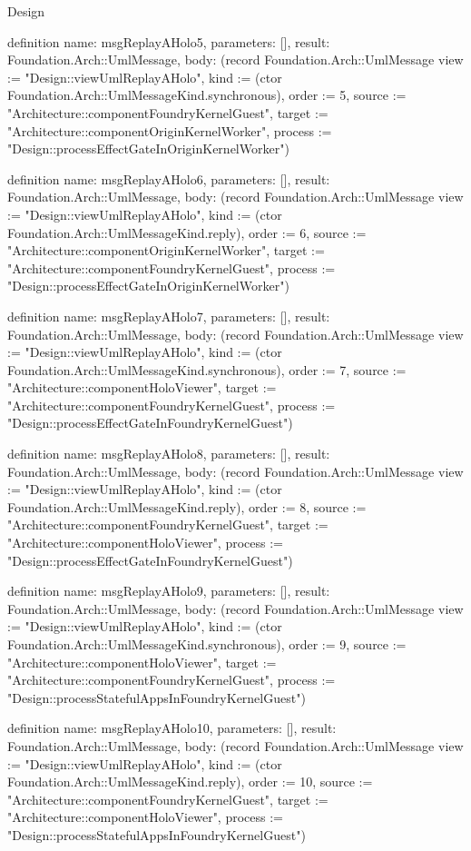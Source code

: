 \begin{lexlean}{Design}
\begin{semanticmodule}
definition{
  name: msgReplayAHolo5,
  parameters: [],
  result: Foundation.Arch::UmlMessage,
  body: (record Foundation.Arch::UmlMessage {view := "Design::viewUmlReplayAHolo", kind := (ctor Foundation.Arch::UmlMessageKind.synchronous), order := 5, source := "Architecture::componentFoundryKernelGuest", target := "Architecture::componentOriginKernelWorker", process := "Design::processEffectGateInOriginKernelWorker"})
}

definition{
  name: msgReplayAHolo6,
  parameters: [],
  result: Foundation.Arch::UmlMessage,
  body: (record Foundation.Arch::UmlMessage {view := "Design::viewUmlReplayAHolo", kind := (ctor Foundation.Arch::UmlMessageKind.reply), order := 6, source := "Architecture::componentOriginKernelWorker", target := "Architecture::componentFoundryKernelGuest", process := "Design::processEffectGateInOriginKernelWorker"})
}

definition{
  name: msgReplayAHolo7,
  parameters: [],
  result: Foundation.Arch::UmlMessage,
  body: (record Foundation.Arch::UmlMessage {view := "Design::viewUmlReplayAHolo", kind := (ctor Foundation.Arch::UmlMessageKind.synchronous), order := 7, source := "Architecture::componentHoloViewer", target := "Architecture::componentFoundryKernelGuest", process := "Design::processEffectGateInFoundryKernelGuest"})
}

definition{
  name: msgReplayAHolo8,
  parameters: [],
  result: Foundation.Arch::UmlMessage,
  body: (record Foundation.Arch::UmlMessage {view := "Design::viewUmlReplayAHolo", kind := (ctor Foundation.Arch::UmlMessageKind.reply), order := 8, source := "Architecture::componentFoundryKernelGuest", target := "Architecture::componentHoloViewer", process := "Design::processEffectGateInFoundryKernelGuest"})
}

definition{
  name: msgReplayAHolo9,
  parameters: [],
  result: Foundation.Arch::UmlMessage,
  body: (record Foundation.Arch::UmlMessage {view := "Design::viewUmlReplayAHolo", kind := (ctor Foundation.Arch::UmlMessageKind.synchronous), order := 9, source := "Architecture::componentHoloViewer", target := "Architecture::componentFoundryKernelGuest", process := "Design::processStatefulAppsInFoundryKernelGuest"})
}

definition{
  name: msgReplayAHolo10,
  parameters: [],
  result: Foundation.Arch::UmlMessage,
  body: (record Foundation.Arch::UmlMessage {view := "Design::viewUmlReplayAHolo", kind := (ctor Foundation.Arch::UmlMessageKind.reply), order := 10, source := "Architecture::componentFoundryKernelGuest", target := "Architecture::componentHoloViewer", process := "Design::processStatefulAppsInFoundryKernelGuest"})
}


\end{semanticmodule}
\end{lexlean}

